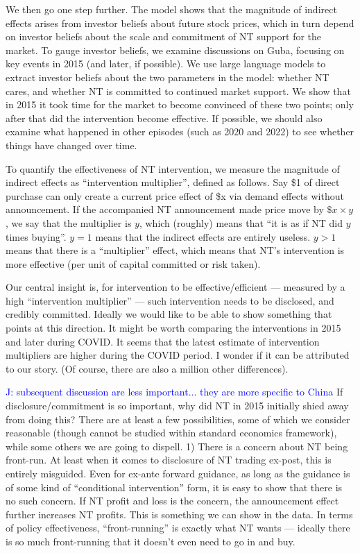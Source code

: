 \documentclass[12pt]{article}
\begin{document}
We then go one step further. The model shows that the magnitude of indirect effects arises from investor beliefs about future stock prices, which in turn depend on investor beliefs about the scale and commitment of NT support for the market. To gauge investor beliefs, we examine discussions on Guba, focusing on key events in 2015 (and later, if possible). We use large language models to extract investor beliefs about the two parameters in the model: whether NT cares, and whether NT is committed to continued market support. We show that in 2015 it took time for the market to become convinced of these two points; only after that did the intervention become effective. If possible, we should also examine what happened in other episodes (such as 2020 and 2022) to see whether things have changed over time.

To quantify the effectiveness of NT intervention, we measure the magnitude of indirect effects as ``intervention multiplier'', defined as follows. Say \$1 of direct purchase can only create a current price effect of \$x via demand effects without announcement. If the accompanied NT announcement made price move by $\$x \times y$, we say that the multiplier is $y$, which (roughly) means that ``it is as if NT did $y$ times buying''. $y=1$ means that the indirect effects are entirely useless. $y>1$ means that there is a ``multiplier'' effect, which means that NT's intervention is more effective (per unit of capital committed or risk taken). 

Our central insight is, for intervention to be effective/efficient --- measured by a high ``intervention multiplier'' --- such intervention needs to be disclosed, and credibly committed. Ideally we would like to be able to show something that points at this direction. It  might be worth comparing the interventions in 2015 and later during COVID. It seems that the latest estimate of intervention multipliers are higher during the COVID period. I wonder if it can be attributed to our story. (Of course, there are also a million other differences). 

\textcolor{blue}{J: subsequent discussion are less important... they are more specific to China}
If disclosure/commitment is so important, why did NT in 2015 initially shied away from doing this? There are at least a few possibilities, some of which we consider reasonable (though cannot be studied within standard economics framework), while some others we are going to dispell. 1) There is a concern about NT being front-run. At least when it comes to disclosure of NT trading ex-post, this is entirely misguided. Even for ex-ante forward guidance, as long as the guidance is of some kind of ``conditional intervention'' form, it is easy to show that there is no such concern. If NT profit and loss is the concern, the announcement effect further increases NT profits. This is something we can show in the data. In terms of policy effectiveness, ``front-running'' is exactly what NT wants --- ideally there is so much front-running that it doesn't even need to go in and buy. 
\end{document}
